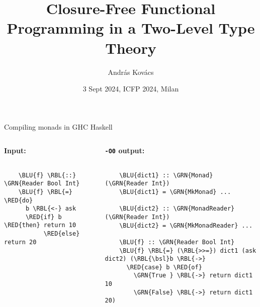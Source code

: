 \documentclass[dvipsnames,aspectratio=169]{beamer}
\title{Closure-Free Functional Programming in a Two-Level Type Theory}
\author{András Kovács}
\institute{University of Gothenburg}
\date{3 Sept 2024, ICFP 2024, Milan}
\theoremstyle{remark}
\newcommand{\RED}[1]{{\color{BrickRed} #1}}
\newcommand{\GRN}[1]{{\color{OliveGreen} #1}}
\newcommand{\RBL}[1]{{\color{RoyalBlue} #1}}
\newcommand{\BLU}[1]{{\color{Blue} #1}}
\newcommand{\bsl}{\textbackslash}
\begin{document}
\frame{\titlepage}

\begin{frame}[fragile]{Compiling monads in GHC Haskell}

\begin{columns}
\begin{column}{0.3\textwidth}
\textbf{Input:}
\begin{Verbatim}[commandchars=\\\{\}]

    \BLU{f} \RBL{::} \GRN{Reader Bool Int}
    \BLU{f} \RBL{=} \RED{do}
      b \RBL{<-} ask
      \RED{if} b \RED{then} return 10
           \RED{else} return 20






\end{Verbatim}
\end{column}
\pause
\begin{column}{0.5\textwidth}
\textbf{\texttt{-O0} output:}
\begin{Verbatim}[commandchars=\\\{\}]

    \BLU{dict1} :: \GRN{Monad} (\GRN{Reader Int})
    \BLU{dict1} = \GRN{MkMonad} ...

    \BLU{dict2} :: \GRN{MonadReader} (\GRN{Reader Int})
    \BLU{dict2} = \GRN{MkMonadReader} ...

    \BLU{f} :: \GRN{Reader Bool Int}
    \BLU{f} \RBL{=} (\RBL{>>=}) dict1 (ask dict2) (\RBL{\bsl}b \RBL{->}
      \RED{case} b \RED{of}
        \GRN{True } \RBL{->} return dict1 10
        \GRN{False} \RBL{->} return dict1 20)
\end{Verbatim}
\end{column}
\end{columns}

\end{frame}

\end{document}

